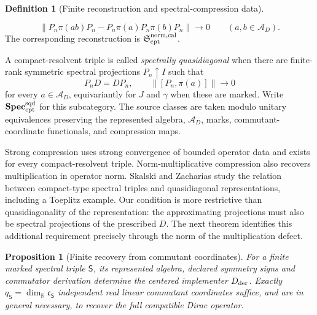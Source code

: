 \documentclass[11pt]{article}
\newtheorem{proposition}[proposition]{Proposition}
\theoremstyle{definition}
\newtheorem{definition}[definition]{Definition}
\theoremstyle{remark}
\theoremstyle{definition}
\theoremstyle{remark}
\newcommand{\A}{\mathcal A}
\begin{document}
\begin{definition}[Finite reconstruction and spectral-compression data]
\begin{enumerate}[label=\textup{(C\arabic*)},leftmargin=3em]
\begin{equation}
      \|P_n\pi(ab)P_n-P_n\pi(a)P_n\pi(b)P_n\|\longrightarrow0
      \qquad(a,b\in\A_D).
      \label{eq:norm-multiplicative-compression}
      \end{equation}
      The corresponding reconstruction is $\mathfrak S_{\rm cpt}^{\rm norm,cal}$.
\end{enumerate}
A compact-resolvent triple is called \emph{spectrally quasidiagonal} when there
are finite-rank symmetric spectral projections $P_n\uparrow I$ such that
\begin{equation}
 P_nD=DP_n,
 \qquad
 \|[P_n,\pi(a)]\|\longrightarrow0
 \label{eq:sqd}
\end{equation}
for every $a\in\A_D$, equivariantly for $J$ and $\gamma$ when these are marked.
Write $\mathbf{Spec}_{\rm cpt}^{\rm sqd}$ for this subcategory.  The source classes
are taken modulo unitary equivalences preserving the represented algebra,
$\A_D$, marks, commutant-coordinate functionals, and compression maps.
\end{definition}

Strong compression uses strong convergence of bounded operator data and
exists for every compact-resolvent triple.  Norm-multiplicative compression
also recovers multiplication in operator norm.  Skalski and Zacharias
\cite{SkalskiZacharias2009} study the relation between compact-type spectral
triples and quasidiagonal representations, including a Toeplitz example.
Our condition is more restrictive than quasidiagonality of the representation:
the approximating projections must also be spectral projections of the
prescribed $D$.  The next theorem identifies this additional requirement
precisely through the norm of the multiplication defect.

\begin{proposition}[Finite recovery from commutant coordinates]
\label{prop:finite-calibrated-recovery}
For a finite marked spectral triple $\mathsf S$, its represented algebra, declared
symmetry signs and commutator derivation determine the centered implementer
$D_{\rm der}$.  Exactly
$q_{\mathsf S}=\dim_{\mathbb R}\mathfrak c_{\mathsf S}$ independent real linear
commutant coordinates suffice, and are in general necessary, to recover the full
compatible Dirac operator.
\end{proposition}
\end{document}
